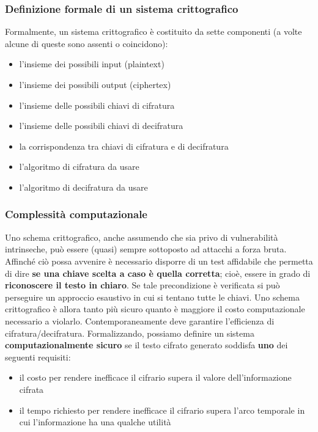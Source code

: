 \subsubsection{Definizione formale di un sistema crittografico} Formalmente, un sistema crittografico è costituito da sette componenti (a volte alcune di queste sono assenti o coincidono):
\begin{itemize} 
  \item l'insieme dei possibili input (plaintext)
  \item l'insieme dei possibili output (ciphertex)
  \item l'insieme delle possibili chiavi di cifratura
  \item l'insieme delle possibili chiavi di decifratura
  \item la corrispondenza tra chiavi di cifratura e di decifratura
  \item l'algoritmo di cifratura da usare
  \item l'algoritmo di decifratura da usare
\end{itemize}

\subsubsection{Complessità computazionale} 
Uno schema crittografico, anche assumendo che sia privo di vulnerabilità intrinseche, può essere (quasi) sempre sottoposto ad attacchi a forza bruta. Affinché ciò possa avvenire è necessario disporre di un test affidabile che permetta di dire \textbf{se una chiave scelta a caso è quella corretta}; cioè, essere in grado di \textbf{riconoscere il testo in chiaro}. Se tale precondizione è verificata si può perseguire un approccio esaustivo in cui si tentano tutte le chiavi. Uno schema crittografico è allora tanto più sicuro quanto è maggiore il costo computazionale necessario a violarlo. Contemporaneamente deve garantire l'efficienza di cifratura/decifratura. Formalizzando, possiamo definire un sistema \textbf{computazionalmente sicuro} se il testo cifrato generato soddisfa \textbf{uno} dei seguenti requisiti:
\begin{itemize} 
  \item il costo per rendere inefficace il cifrario supera il valore dell'informazione cifrata
  \item il tempo richiesto per rendere inefficace il cifrario supera l'arco temporale in cui l'informazione ha una qualche utilità
\end{itemize}

